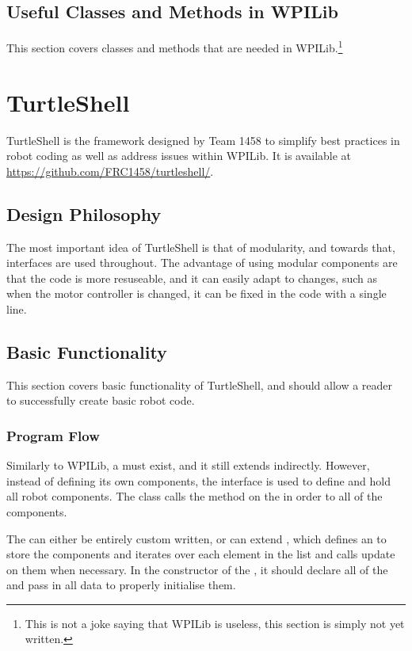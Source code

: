 \documentclass[]{report}
\begin{document}
\section{Useful Classes and Methods in WPILib}
This section covers classes and methods that are needed in WPILib.\footnote{This is not a joke saying that WPILib is useless, this section is simply not yet written.}

\chapter{TurtleShell}
\label{TurtleShell}
TurtleShell is the framework designed by Team 1458 to simplify best practices in robot coding as well as address issues within WPILib.
It is available at \url{https://github.com/FRC1458/turtleshell/}.
\section{Design Philosophy}
The most important idea of TurtleShell is that of modularity, and towards that, interfaces are used throughout.
The advantage of using modular components are that the code is more resuseable, and it can easily adapt to changes, such as when the motor controller is changed, it can be fixed in the code with a single line.


\section{Basic Functionality}
This section covers basic functionality of TurtleShell, and should allow a reader to successfully create basic robot code.

\subsection{Program Flow}
Similarly to WPILib, a  must exist, and it still extends  indirectly.
However, instead of defining its own components, the  interface is used to define and hold all robot components.
The  class calls the  method on the  in order to  all of the components.

The  can either be entirely custom written, or can extend , which defines an  to store the components and iterates over each element in the list and calls update on them when necessary.
In the constructor of the , it should declare all of the  and pass in all data to properly initialise them.
\end{document}
